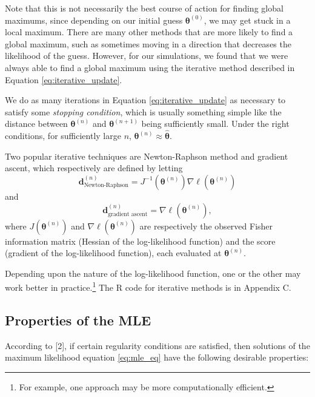 \documentclass[
]{article}
\begin{document}
Note that this is not necessarily the best course of action for finding
global maximums, since depending on our initial guess
\(\boldsymbol{\theta}^{(0)}\), we may get stuck in a local maximum.
There are many other methods that are more likely to find a global
maximum, such as sometimes moving in a direction that decreases the
likelihood of the guess. However, for our simulations, we found that we
were always able to find a global maximum using the iterative method
described in Equation \eqref{eq:iterative_update}.

We do as many iterations in Equation \eqref{eq:iterative_update} as
necessary to satisfy some \emph{stopping condition}, which is usually
something simple like the distance between \(\boldsymbol{\theta}^{(n)}\)
and \(\boldsymbol{\theta}^{(n+1)}\) being sufficiently small. Under the
right conditions, for sufficiently large \(n\),
\(\boldsymbol{\theta}^{(n)} \approx \hat{\boldsymbol{\theta}}\).

Two popular iterative techniques are Newton-Raphson method and gradient
ascent, which respectively are defined by letting \[
\boldsymbol{d}^{(n)}_{\text{Newton-Raphson}} = J^{-1}(\boldsymbol{\theta}^{(n)}) \nabla \ell(\boldsymbol{\theta}^{(n)})
\] and \[
\boldsymbol{d}^{(n)}_{\text{gradient ascent}} = \nabla \ell(\boldsymbol{\theta}^{(n)}),
\] where \(J(\boldsymbol{\theta}^{(n)})\) and
\(\nabla \ell(\boldsymbol{\theta}^{(n)})\) are respectively the observed
Fisher information matrix (Hessian of the log-likelihood function) and
the score (gradient of the log-likelihood function), each evaluated at
\(\boldsymbol{\theta}^{(n)}\).

Depending upon the nature of the log-likelihood function, one or the
other may work better in
practice.\footnote{For example, one approach may be more
computationally efficient.} The R code for iterative methods is in
Appendix C.

\hypertarget{properties-of-the-mle}{%
\subsection{Properties of the MLE}\label{properties-of-the-mle}}

According to {[}2{]}, if certain regularity conditions are satisfied,
then solutions of the maximum likelihood equation \eqref{eq:mle_eq} have
the following desirable properties:
\end{document}
